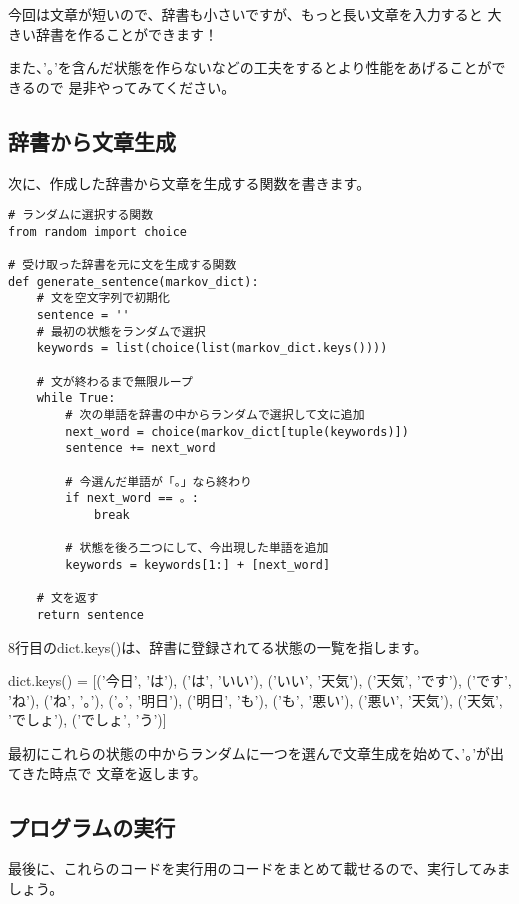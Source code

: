 \documentclass{jsarticle}
\begin{document}
            今回は文章が短いので、辞書も小さいですが、もっと長い文章を入力すると
            大きい辞書を作ることができます！

            また、'。'を含んだ状態を作らないなどの工夫をするとより性能をあげることができるので
            是非やってみてください。

        \subsection*{辞書から文章生成}
            次に、作成した辞書から文章を生成する関数を書きます。

            \begin{lstlisting}[caption=文章を生成する関数]
# ランダムに選択する関数
from random import choice

# 受け取った辞書を元に文を生成する関数
def generate_sentence(markov_dict):
    # 文を空文字列で初期化
    sentence = ''
    # 最初の状態をランダムで選択
    keywords = list(choice(list(markov_dict.keys())))

    # 文が終わるまで無限ループ
    while True:
        # 次の単語を辞書の中からランダムで選択して文に追加
        next_word = choice(markov_dict[tuple(keywords)])
        sentence += next_word

        # 今選んだ単語が「。」なら終わり
        if next_word == 。:
            break
        
        # 状態を後ろ二つにして、今出現した単語を追加
        keywords = keywords[1:] + [next_word]

    # 文を返す
    return sentence
            \end{lstlisting}

            8行目のdict.keys()は、辞書に登録されてる状態の一覧を指します。

            dict.keys() = [('今日', 'は'), ('は', 'いい'), ('いい', '天気'),
            ('天気', 'です'), ('です', 'ね'), ('ね', '。'), ('。', '明日'),
            ('明日', 'も'), ('も', '悪い'), ('悪い', '天気'), ('天気', 'でしょ'),
            ('でしょ', 'う')]

            最初にこれらの状態の中からランダムに一つを選んで文章生成を始めて、'。'が出てきた時点で
            文章を返します。

        \subsection*{プログラムの実行}
            最後に、これらのコードを実行用のコードをまとめて載せるので、実行してみましょう。
\end{document}
